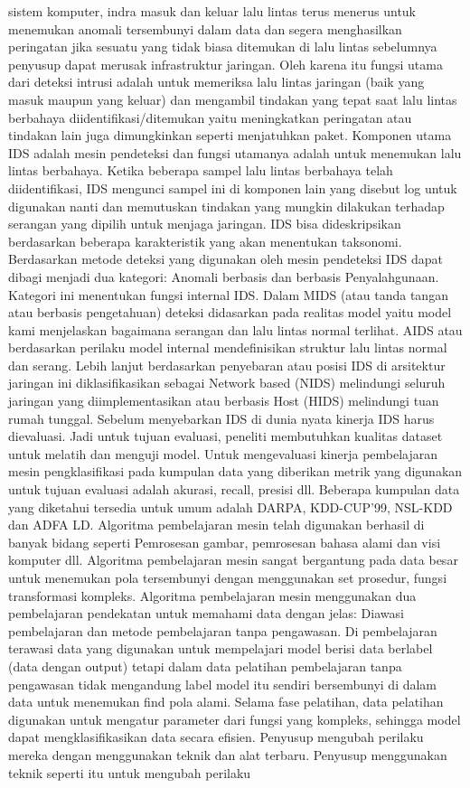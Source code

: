 \documentclass[conference]{IEEEtran}
\begin{document}
sistem komputer, indra masuk dan keluar lalu lintas terus menerus untuk menemukan anomali tersembunyi dalam data dan segera menghasilkan peringatan jika sesuatu yang tidak biasa ditemukan di lalu lintas sebelumnya penyusup dapat merusak infrastruktur jaringan\cite{masoodi2019symmetricpage79}. Oleh karena itu fungsi utama dari deteksi intrusi adalah untuk memeriksa lalu lintas jaringan (baik yang masuk maupun yang keluar) dan mengambil tindakan yang tepat saat lalu lintas berbahaya diidentifikasi/ditemukan yaitu meningkatkan peringatan atau tindakan lain juga dimungkinkan seperti menjatuhkan paket. Komponen utama IDS adalah mesin pendeteksi dan fungsi utamanya adalah untuk menemukan lalu lintas berbahaya. Ketika beberapa sampel lalu lintas berbahaya telah diidentifikasi, IDS mengunci sampel ini di komponen lain yang disebut log untuk digunakan nanti dan memutuskan tindakan yang mungkin dilakukan terhadap serangan yang dipilih untuk menjaga jaringan. IDS bisa dideskripsikan berdasarkan beberapa karakteristik yang akan menentukan taksonomi. Berdasarkan metode deteksi yang digunakan oleh mesin pendeteksi IDS dapat dibagi menjadi dua kategori\cite{ashoor2011difference}: Anomali berbasis dan berbasis Penyalahgunaan. Kategori ini menentukan fungsi internal IDS. Dalam MIDS (atau tanda tangan atau berbasis pengetahuan) deteksi didasarkan pada realitas model yaitu model kami menjelaskan bagaimana serangan dan lalu lintas normal terlihat. AIDS atau berdasarkan perilaku model internal mendefinisikan struktur lalu lintas normal dan serang. Lebih lanjut berdasarkan penyebaran atau posisi IDS di arsitektur jaringan ini diklasifikasikan sebagai Network based (NIDS) melindungi seluruh jaringan yang diimplementasikan atau berbasis Host (HIDS) melindungi tuan rumah tunggal. Sebelum menyebarkan IDS di dunia nyata kinerja IDS harus dievaluasi. Jadi untuk tujuan evaluasi, peneliti membutuhkan kualitas dataset untuk melatih dan menguji model. Untuk mengevaluasi kinerja pembelajaran mesin pengklasifikasi pada kumpulan data yang diberikan metrik yang digunakan untuk tujuan evaluasi adalah akurasi, recall, presisi dll. Beberapa kumpulan data yang diketahui tersedia untuk umum adalah DARPA, KDD-CUP'99, NSL-KDD dan ADFA LD. Algoritma pembelajaran mesin telah digunakan berhasil di banyak bidang seperti Pemrosesan gambar, pemrosesan bahasa alami dan visi komputer dll. Algoritma pembelajaran mesin sangat bergantung pada data besar untuk menemukan pola tersembunyi dengan menggunakan set prosedur, fungsi transformasi kompleks\cite{rajadurai2020stacked}\cite{thaseen2020network}. Algoritma pembelajaran mesin menggunakan dua pembelajaran pendekatan untuk memahami data dengan jelas: Diawasi pembelajaran dan metode pembelajaran tanpa pengawasan. Di pembelajaran terawasi data yang digunakan untuk mempelajari model berisi data berlabel (data dengan output) tetapi dalam data pelatihan pembelajaran tanpa pengawasan tidak mengandung label model itu sendiri bersembunyi di dalam data untuk menemukan find pola alami. Selama fase pelatihan, data pelatihan digunakan untuk mengatur parameter dari fungsi yang kompleks, sehingga model dapat mengklasifikasikan data secara efisien. Penyusup mengubah perilaku mereka dengan menggunakan teknik dan alat terbaru. Penyusup menggunakan teknik seperti itu untuk mengubah perilaku 
\end{document}
